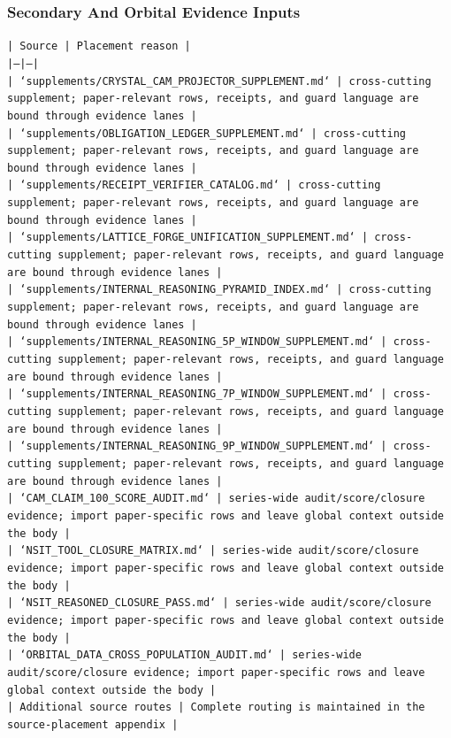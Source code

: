 \documentclass[11pt]{article}
\begin{document}
\subsubsection*{Secondary And Orbital Evidence Inputs}

\noindent\texttt{| Source | Placement reason |}\\
\noindent\texttt{|---|---|}\\
\noindent\texttt{| `supplements/CRYSTAL\_CAM\_PROJECTOR\_SUPPLEMENT.md` | cross-cutting supplement; paper-relevant rows, receipts, and guard language are bound through evidence lanes |}\\
\noindent\texttt{| `supplements/OBLIGATION\_LEDGER\_SUPPLEMENT.md` | cross-cutting supplement; paper-relevant rows, receipts, and guard language are bound through evidence lanes |}\\
\noindent\texttt{| `supplements/RECEIPT\_VERIFIER\_CATALOG.md` | cross-cutting supplement; paper-relevant rows, receipts, and guard language are bound through evidence lanes |}\\
\noindent\texttt{| `supplements/LATTICE\_FORGE\_UNIFICATION\_SUPPLEMENT.md` | cross-cutting supplement; paper-relevant rows, receipts, and guard language are bound through evidence lanes |}\\
\noindent\texttt{| `supplements/INTERNAL\_REASONING\_PYRAMID\_INDEX.md` | cross-cutting supplement; paper-relevant rows, receipts, and guard language are bound through evidence lanes |}\\
\noindent\texttt{| `supplements/INTERNAL\_REASONING\_5P\_WINDOW\_SUPPLEMENT.md` | cross-cutting supplement; paper-relevant rows, receipts, and guard language are bound through evidence lanes |}\\
\noindent\texttt{| `supplements/INTERNAL\_REASONING\_7P\_WINDOW\_SUPPLEMENT.md` | cross-cutting supplement; paper-relevant rows, receipts, and guard language are bound through evidence lanes |}\\
\noindent\texttt{| `supplements/INTERNAL\_REASONING\_9P\_WINDOW\_SUPPLEMENT.md` | cross-cutting supplement; paper-relevant rows, receipts, and guard language are bound through evidence lanes |}\\
\noindent\texttt{| `CAM\_CLAIM\_100\_SCORE\_AUDIT.md` | series-wide audit/score/closure evidence; import paper-specific rows and leave global context outside the body |}\\
\noindent\texttt{| `NSIT\_TOOL\_CLOSURE\_MATRIX.md` | series-wide audit/score/closure evidence; import paper-specific rows and leave global context outside the body |}\\
\noindent\texttt{| `NSIT\_REASONED\_CLOSURE\_PASS.md` | series-wide audit/score/closure evidence; import paper-specific rows and leave global context outside the body |}\\
\noindent\texttt{| `ORBITAL\_DATA\_CROSS\_POPULATION\_AUDIT.md` | series-wide audit/score/closure evidence; import paper-specific rows and leave global context outside the body |}\\
\noindent\texttt{| Additional source routes | Complete routing is maintained in the source-placement appendix |}\\
\end{document}
